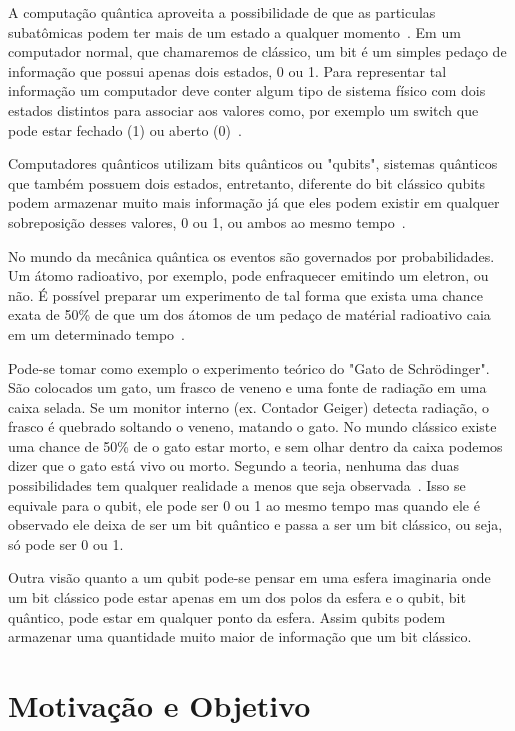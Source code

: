 \documentclass[a4paper, 12pt, oneside]{book}
\begin{document}
A computação quântica aproveita a possibilidade de que as particulas subatômicas podem ter mais de um estado a qualquer momento~\cite{wiredQC}. Em um computador normal, que chamaremos de clássico, um bit é um simples pedaço de informação que possui apenas dois estados, 0 ou 1. Para representar tal informação um computador deve conter algum tipo de sistema físico com dois estados distintos para associar aos valores como, por exemplo um switch que pode estar fechado (1) ou aberto (0)~\cite{mermin}.

Computadores quânticos utilizam bits quânticos ou "qubits", sistemas quânticos que também possuem dois estados, entretanto, diferente do bit clássico qubits podem armazenar muito mais informação já que eles podem existir em qualquer sobreposição desses valores, 0 ou 1, ou ambos ao mesmo tempo~\cite{wiredQC}. 

No mundo da mecânica quântica os eventos são governados por probabilidades. Um átomo radioativo, por exemplo, pode enfraquecer emitindo um eletron, ou não. É possível preparar um experimento de tal forma que exista uma chance exata de 50\% de que um dos átomos de um pedaço de matérial radioativo caia em um determinado tempo~\cite{gribbin}.

Pode-se tomar como exemplo o experimento teórico do "Gato de Schrödinger". São colocados um gato, um frasco de veneno e uma fonte de radiação em uma caixa selada. Se um monitor interno (ex. Contador Geiger) detecta radiação, o frasco é quebrado soltando o veneno, matando o gato. No mundo clássico existe uma chance de 50\% de o gato estar morto, e sem olhar dentro da caixa podemos dizer que o gato está vivo ou morto. Segundo a teoria, nenhuma das duas possibilidades tem qualquer realidade a menos que seja observada~\cite{gribbin}. Isso se equivale para o qubit, ele pode ser 0 ou 1 ao mesmo tempo mas quando ele é observado ele deixa de ser um bit quântico e passa a ser um bit clássico, ou seja, só pode ser 0 ou 1.

Outra visão quanto a um qubit pode-se pensar em uma esfera imaginaria onde um bit clássico pode estar apenas em um dos polos da esfera e o qubit, bit quântico, pode estar em qualquer ponto da esfera. Assim qubits podem armazenar uma quantidade muito maior de informação que um bit clássico.

\section{Motivação e Objetivo}
\end{document}

